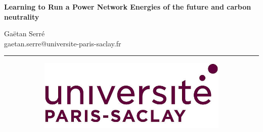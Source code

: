 \documentclass[a4paper]{article}
\begin{document}
\setlength{\headheight}{13.59999pt}
\addtolength{\topmargin}{-1.59999pt}

\begin{center}
  \vspace*{5cm}

  \textbf{\large Learning to Run a Power Network Energies of the future and carbon neutrality}

  \vspace*{1cm}

  Gaëtan Serré \\
  {\ttfamily gaetan.serre@universite-paris-saclay.fr}

  \vspace*{10cm}

  \vfill
  \noindent\rule{\textwidth}{0.4pt}
  \begin{figure}[H]
      \centering
      \begin{subfigure}{.35\textwidth}
          \includegraphics[width=\textwidth]{ups-logo.png}
      \end{subfigure}
  \end{figure}
\end{center}

\pagebreak
\restoregeometry

\end{document}
